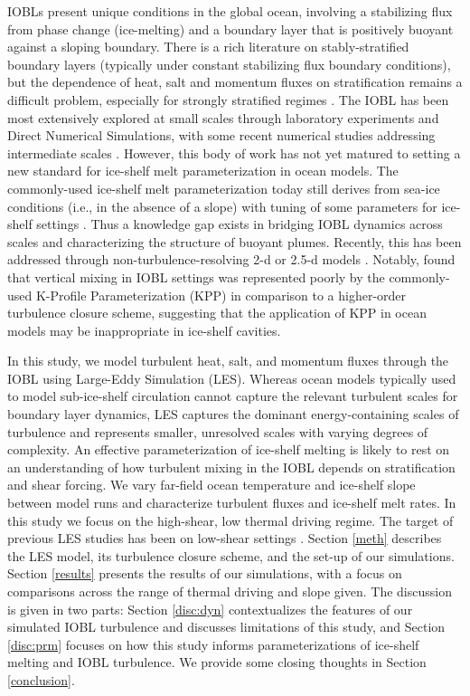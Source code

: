 \documentclass[draft]{agujournal2019}
\begin{document}
IOBLs present unique conditions in the global ocean, involving a stabilizing flux from phase change (ice-melting) and a boundary layer that is positively buoyant against a sloping boundary. There is a rich literature on stably-stratified boundary layers (typically under constant stabilizing flux boundary conditions), but the dependence of heat, salt and momentum fluxes on stratification remains a difficult problem, especially for strongly stratified regimes \cite{zonta_stably_2018}. The IOBL has been most extensively explored at small scales through laboratory experiments and Direct Numerical Simulations, with some recent numerical studies addressing intermediate scales \cite{mondal_ablation_2019, vreugdenhil_stratification_2019, middleton_numerical_2021}. However, this body of work has not yet matured to setting a new standard for ice-shelf melt parameterization in ocean models. The commonly-used ice-shelf melt parameterization today still derives from sea-ice conditions (i.e., in the absence of a slope) with tuning of some parameters for ice-shelf settings \cite{holland_modeling_1999, jenkins_observation_2010, mcphee_dynamics_1987}. Thus a knowledge gap exists in bridging IOBL dynamics across scales and characterizing the structure of buoyant plumes. Recently, this has been addressed through non-turbulence-resolving 2-d or 2.5-d models \cite{jenkins_simple_2016, jenkins_shear_2021, cheng_modeling_2020}. Notably,  found that vertical mixing in IOBL settings was represented poorly by the commonly-used K-Profile Parameterization (KPP) in comparison to a higher-order turbulence closure scheme, suggesting that the application of KPP in ocean models may be inappropriate in ice-shelf cavities. 


In this study, we model turbulent heat, salt, and momentum fluxes through the IOBL using Large-Eddy Simulation (LES). Whereas ocean models typically used to model sub-ice-shelf circulation cannot capture the relevant turbulent scales for boundary layer dynamics, LES captures the dominant energy-containing scales of turbulence and represents smaller, unresolved scales with varying degrees of complexity. An effective parameterization of ice-shelf melting is likely to rest on an understanding of how turbulent mixing in the IOBL depends on stratification and shear forcing. We vary far-field ocean temperature and ice-shelf slope between model runs and characterize turbulent fluxes and ice-shelf melt rates. In this study we focus on the high-shear, low thermal driving regime. The target of previous LES studies has been on low-shear settings \cite{vreugdenhil_stratification_2019, middleton_numerical_2021}. Section \ref{meth} describes the LES model, its turbulence closure scheme, and the set-up of our simulations. Section \ref{results} presents the results of our simulations, with a focus on comparisons across the range of thermal driving and slope given. The discussion is given in two parts: Section \ref{disc:dyn} contextualizes the features of our simulated IOBL turbulence and discusses limitations of this study, and Section \ref{disc:prm} focuses on how this study informs parameterizations of ice-shelf melting and IOBL turbulence. We provide some closing thoughts in Section \ref{conclusion}.
\end{document}
